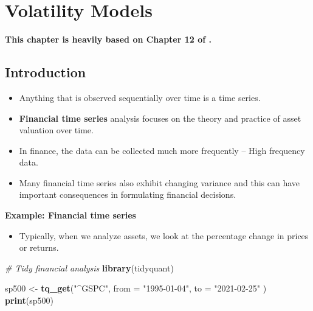 \documentclass[]{book}
\newenvironment{Shaded}{\begin{snugshade}}{\end{snugshade}}
\newcommand{\CommentTok}[1]{\textcolor[rgb]{0.56,0.35,0.01}{\textit{#1}}}
\newcommand{\DataTypeTok}[1]{\textcolor[rgb]{0.13,0.29,0.53}{#1}}
\newcommand{\KeywordTok}[1]{\textcolor[rgb]{0.13,0.29,0.53}{\textbf{#1}}}
\newcommand{\NormalTok}[1]{#1}
\newcommand{\StringTok}[1]{\textcolor[rgb]{0.31,0.60,0.02}{#1}}
\providecommand{\tightlist}{%
  \setlength{\itemsep}{0pt}\setlength{\parskip}{0pt}}
\begin{document}
\newpage

\hypertarget{volatility-models}{%
\chapter{Volatility Models}\label{volatility-models}}


\textbf{This chapter is heavily based on Chapter 12 of \citet{chatfield2019analysis}.}

\hypertarget{introduction-1}{%
\section{Introduction}\label{introduction-1}}

\begin{itemize}
\tightlist
\item
  Anything that is observed sequentially over time is a time series.
\end{itemize}

\begin{itemize}
\tightlist
\item
  \textbf{Financial time series} analysis focuses on the theory and practice of asset valuation over time.
\end{itemize}

\begin{itemize}
\tightlist
\item
  In finance, the data can be collected much more frequently -- High frequency data.
\item
  Many financial time series also exhibit changing variance and this can have important consequences in formulating financial decisions.
\end{itemize}

\textbf{Example: Financial time series}

\begin{itemize}
\tightlist
\item
  Typically, when we analyze assets, we look at the percentage change in prices or returns.
\end{itemize}

\begin{Shaded}
\begin{Highlighting}[]
\CommentTok{# Tidy financial analysis }
\KeywordTok{library}\NormalTok{(tidyquant)}

\NormalTok{sp500 <-}\StringTok{ }\KeywordTok{tq_get}\NormalTok{(}\StringTok{"^GSPC"}\NormalTok{, }\DataTypeTok{from =} \StringTok{"1995-01-04"}\NormalTok{, }\DataTypeTok{to =} \StringTok{"2021-02-25"}\NormalTok{ )}
\KeywordTok{print}\NormalTok{(sp500)}
\end{Highlighting}
\end{Shaded}
\end{document}
